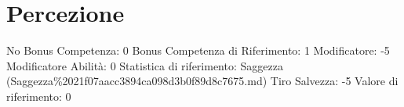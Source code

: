 \section{Percezione}\label{percezione}

\begin{description}
\tightlist
\item[Tags: ABI]
No Bonus Competenza: 0 Bonus Competenza di Riferimento: 1 Modificatore:
-5 Modificatore Abilità: 0 Statistica di riferimento: Saggezza
(Saggezza\%2021f07aacc3894ca098d3b0f89d8c7675.md) Tiro Salvezza: -5
Valore di riferimento: 0
\end{description}
